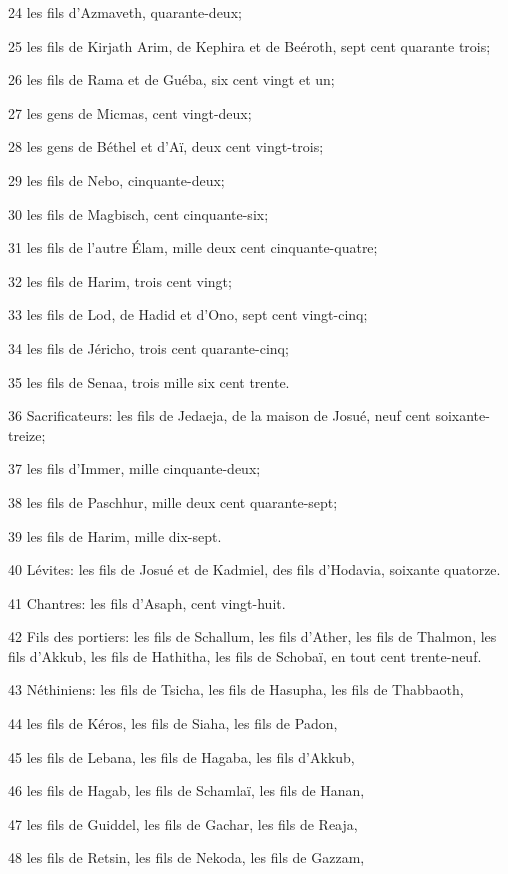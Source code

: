 \par 24 les fils d'Azmaveth, quarante-deux;
\par 25 les fils de Kirjath Arim, de Kephira et de Beéroth, sept cent quarante trois;
\par 26 les fils de Rama et de Guéba, six cent vingt et un;
\par 27 les gens de Micmas, cent vingt-deux;
\par 28 les gens de Béthel et d'Aï, deux cent vingt-trois;
\par 29 les fils de Nebo, cinquante-deux;
\par 30 les fils de Magbisch, cent cinquante-six;
\par 31 les fils de l'autre Élam, mille deux cent cinquante-quatre;
\par 32 les fils de Harim, trois cent vingt;
\par 33 les fils de Lod, de Hadid et d'Ono, sept cent vingt-cinq;
\par 34 les fils de Jéricho, trois cent quarante-cinq;
\par 35 les fils de Senaa, trois mille six cent trente.
\par 36 Sacrificateurs: les fils de Jedaeja, de la maison de Josué, neuf cent soixante-treize;
\par 37 les fils d'Immer, mille cinquante-deux;
\par 38 les fils de Paschhur, mille deux cent quarante-sept;
\par 39 les fils de Harim, mille dix-sept.
\par 40 Lévites: les fils de Josué et de Kadmiel, des fils d'Hodavia, soixante quatorze.
\par 41 Chantres: les fils d'Asaph, cent vingt-huit.
\par 42 Fils des portiers: les fils de Schallum, les fils d'Ather, les fils de Thalmon, les fils d'Akkub, les fils de Hathitha, les fils de Schobaï, en tout cent trente-neuf.
\par 43 Néthiniens: les fils de Tsicha, les fils de Hasupha, les fils de Thabbaoth,
\par 44 les fils de Kéros, les fils de Siaha, les fils de Padon,
\par 45 les fils de Lebana, les fils de Hagaba, les fils d'Akkub,
\par 46 les fils de Hagab, les fils de Schamlaï, les fils de Hanan,
\par 47 les fils de Guiddel, les fils de Gachar, les fils de Reaja,
\par 48 les fils de Retsin, les fils de Nekoda, les fils de Gazzam,
